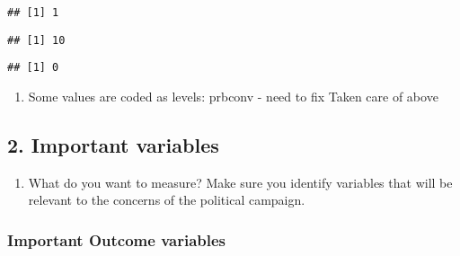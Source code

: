 \documentclass[]{article}
\newenvironment{Shaded}{\begin{snugshade}}{\end{snugshade}}
\newcommand{\KeywordTok}[1]{\textcolor[rgb]{0.13,0.29,0.53}{\textbf{#1}}}
\newcommand{\DecValTok}[1]{\textcolor[rgb]{0.00,0.00,0.81}{#1}}
\newcommand{\StringTok}[1]{\textcolor[rgb]{0.31,0.60,0.02}{#1}}
\newcommand{\OperatorTok}[1]{\textcolor[rgb]{0.81,0.36,0.00}{\textbf{#1}}}
\newcommand{\NormalTok}[1]{#1}
\providecommand{\tightlist}{%
  \setlength{\itemsep}{0pt}\setlength{\parskip}{0pt}}
\begin{document}
\begin{verbatim}
## [1] 1
\end{verbatim}

\begin{Shaded}
\end{Shaded}

\begin{verbatim}
## [1] 10
\end{verbatim}

\begin{Shaded}
\end{Shaded}

\begin{verbatim}
## [1] 0
\end{verbatim}

\begin{enumerate}
\def\labelenumi{\arabic{enumi}.}
\setcounter{enumi}{2}
\tightlist
\item
  Some values are coded as levels: prbconv - need to fix Taken care of
  above
\end{enumerate}

\subsection{2. Important variables}\label{important-variables}

\begin{enumerate}
\def\labelenumi{\arabic{enumi}.}
\tightlist
\item
  What do you want to measure? Make sure you identify variables that
  will be relevant to the concerns of the political campaign.
\end{enumerate}

\subsubsection{Important Outcome
variables}\label{important-outcome-variables}
\end{document}
